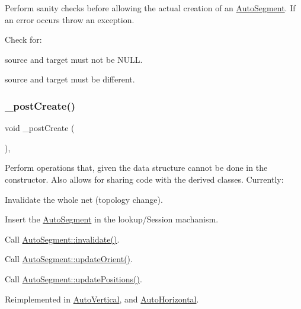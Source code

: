 Perform sanity checks before allowing the actual creation of an \hyperlink{classKatabatic_1_1AutoSegment}{Auto\+Segment}. If an error occurs throw an exception.

Check for\+:
\begin{DoxyItemize}
\item {\ttfamily source} and {\ttfamily target} must not be {\ttfamily N\+U\+LL}.
\item {\ttfamily source} and {\ttfamily target} must be different. 
\end{DoxyItemize}\mbox{\label{classKatabatic_1_1AutoSegment_a3715b38135ca24745f610bebd3407c10}} 
\subsubsection{\texorpdfstring{\+\_\+post\+Create()}{\_postCreate()}}
{\footnotesize\ttfamily void \+\_\+post\+Create (\begin{DoxyParamCaption}{ }\end{DoxyParamCaption})\hspace{0.3cm}{\ttfamily [protected]}, {\ttfamily [virtual]}}

Perform operations that, given the data structure cannot be done in the constructor. Also allows for sharing code with the derived classes. Currently\+:
\begin{DoxyItemize}
\item Invalidate the whole net (topology change).
\item Insert the \hyperlink{classKatabatic_1_1AutoSegment}{Auto\+Segment} in the lookup/\+Session machanism.
\item Call \hyperlink{classKatabatic_1_1AutoSegment_a23599eee5a07af377fbc8d47cda7e7b0}{Auto\+Segment\+::invalidate()}.
\item Call \hyperlink{classKatabatic_1_1AutoSegment_a102e0f4bbb0386e41be214d15a9e4549}{Auto\+Segment\+::update\+Orient()}.
\item Call \hyperlink{classKatabatic_1_1AutoSegment_a6d95f4de39c13611786c95ddc7b8942e}{Auto\+Segment\+::update\+Positions()}. 
\end{DoxyItemize}

Reimplemented in \hyperlink{classKatabatic_1_1AutoVertical_a3715b38135ca24745f610bebd3407c10}{Auto\+Vertical}, and \hyperlink{classKatabatic_1_1AutoHorizontal_a3715b38135ca24745f610bebd3407c10}{Auto\+Horizontal}.



